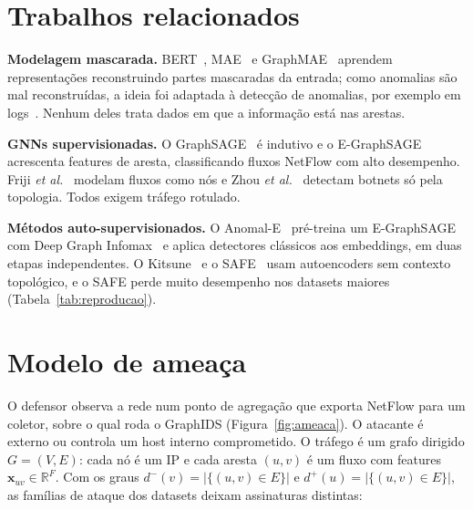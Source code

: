 \documentclass[conference]{IEEEtran}
\newcommand{\vect}[1]{\mathbf{#1}}
\begin{document}
\section{Trabalhos relacionados}

\textbf{Modelagem mascarada.} BERT~\cite{devlin2019bert}, MAE~\cite{he2022mae} e
GraphMAE~\cite{hou2022graphmae} aprendem representações reconstruindo partes
mascaradas da entrada; como anomalias são mal reconstruídas, a ideia foi
adaptada à detecção de anomalias, por exemplo em logs~\cite{guo2021logbert}.
Nenhum deles trata dados em que a informação está nas arestas.

\textbf{GNNs supervisionadas.} O GraphSAGE~\cite{hamilton2017graphsage} é
indutivo e o E-GraphSAGE~\cite{lo2022egraphsage} acrescenta features de aresta,
classificando fluxos NetFlow com alto desempenho. Friji \emph{et
al.}~\cite{friji2023flowgraph} modelam fluxos como nós e Zhou \emph{et
al.}~\cite{zhou2020botnet} detectam botnets só pela topologia. Todos exigem
tráfego rotulado.

\textbf{Métodos auto-supervisionados.} O Anomal-E~\cite{caville2022anomale}
pré-treina um E-GraphSAGE com Deep Graph Infomax~\cite{velickovic2019dgi} e
aplica detectores clássicos aos embeddings, em duas etapas independentes. O
Kitsune~\cite{mirsky2018kitsune} e o SAFE~\cite{li2025safe} usam autoencoders
sem contexto topológico, e o SAFE perde muito desempenho nos datasets maiores
(Tabela~\ref{tab:reproducao}).

\section{Modelo de ameaça}

O defensor observa a rede num ponto de agregação que exporta NetFlow para um
coletor, sobre o qual roda o GraphIDS (Figura~\ref{fig:ameaca}). O atacante é
externo ou controla um host interno comprometido. O tráfego é um grafo dirigido
$G=(V,E)$: cada nó é um IP e cada aresta $(u,v)$ é um fluxo com features
$\vect{x}_{uv}\in\mathbb{R}^F$. Com os graus $d^{-}(v)=|\{(u,v)\in E\}|$ e
$d^{+}(u)=|\{(u,v)\in E\}|$, as famílias de ataque dos datasets deixam
assinaturas distintas:
\end{document}
